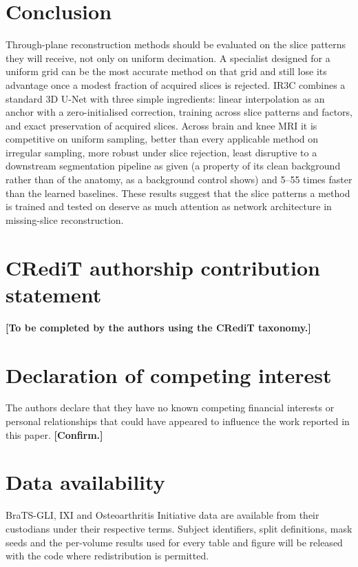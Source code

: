 \documentclass[a4paper,fleqn]{cas-dc}
\newcommand{\authorfill}[1]{\textcolor{pendfg}{\textbf{[#1]}}}
\begin{document}
\section{Conclusion}
\label{sec:conclusion}

Through-plane reconstruction methods should be evaluated on the slice patterns they will
receive, not only on uniform decimation. A specialist designed for a uniform grid can be the
most accurate method on that grid and still lose its advantage once a modest fraction of
acquired slices is rejected. IR3C combines a standard 3D U-Net with three simple ingredients:
linear interpolation as an anchor with a zero-initialised correction, training across slice
patterns and factors, and exact preservation of acquired slices. Across brain and knee MRI it is competitive on uniform
sampling, better than every applicable method on irregular sampling, more robust under slice
rejection, least disruptive to a downstream segmentation pipeline as given (a property of its
clean background rather than of the anatomy, as a background control shows) and 5--55 times
faster than
the learned baselines. These results suggest that the slice patterns a method is trained and
tested on deserve as much attention as network architecture in missing-slice reconstruction.

\section*{CRediT authorship contribution statement}
\authorfill{To be completed by the authors using the CRediT taxonomy.}

\section*{Declaration of competing interest}
The authors declare that they have no known competing financial interests or personal
relationships that could have appeared to influence the work reported in this paper.
\authorfill{Confirm.}

\section*{Data availability}
BraTS-GLI, IXI and Osteoarthritis Initiative data are available from their custodians under
their respective terms. Subject identifiers, split definitions, mask seeds and the
per-volume results used for every table and figure will be released with the code where
redistribution is permitted.
\end{document}
